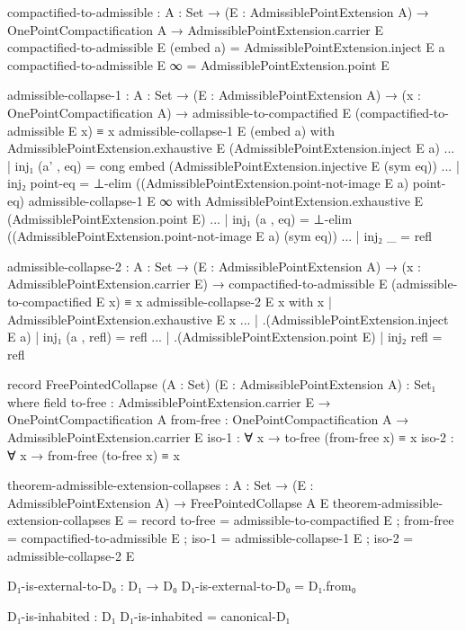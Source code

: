 \documentclass[11pt,a4paper]{book}
\begin{document}
\begin{code}
compactified-to-admissible : {A : Set} → (E : AdmissiblePointExtension A)
                          → OnePointCompactification A
                          → AdmissiblePointExtension.carrier E
compactified-to-admissible E (embed a) = AdmissiblePointExtension.inject E a
compactified-to-admissible E ∞         = AdmissiblePointExtension.point E

admissible-collapse-1 : {A : Set} → (E : AdmissiblePointExtension A)
                     → (x : OnePointCompactification A)
                     → admissible-to-compactified E (compactified-to-admissible E x) ≡ x
admissible-collapse-1 E (embed a) with AdmissiblePointExtension.exhaustive E (AdmissiblePointExtension.inject E a)
... | inj₁ (a' , eq) = cong embed (AdmissiblePointExtension.injective E (sym eq))
... | inj₂ point-eq  = ⊥-elim ((AdmissiblePointExtension.point-not-image E a) point-eq)
admissible-collapse-1 E ∞ with AdmissiblePointExtension.exhaustive E (AdmissiblePointExtension.point E)
... | inj₁ (a , eq) = ⊥-elim ((AdmissiblePointExtension.point-not-image E a) (sym eq))
... | inj₂ _        = refl

admissible-collapse-2 : {A : Set} → (E : AdmissiblePointExtension A)
                     → (x : AdmissiblePointExtension.carrier E)
                     → compactified-to-admissible E (admissible-to-compactified E x) ≡ x
admissible-collapse-2 E x with x | AdmissiblePointExtension.exhaustive E x
... | .(AdmissiblePointExtension.inject E a) | inj₁ (a , refl) = refl
... | .(AdmissiblePointExtension.point E)    | inj₂ refl        = refl

record FreePointedCollapse (A : Set) (E : AdmissiblePointExtension A) : Set₁ where
  field
    to-free   : AdmissiblePointExtension.carrier E → OnePointCompactification A
    from-free : OnePointCompactification A → AdmissiblePointExtension.carrier E
    iso-1     : ∀ x → to-free (from-free x) ≡ x
    iso-2     : ∀ x → from-free (to-free x) ≡ x

theorem-admissible-extension-collapses : {A : Set} → (E : AdmissiblePointExtension A) → FreePointedCollapse A E
theorem-admissible-extension-collapses E = record
  { to-free = admissible-to-compactified E
  ; from-free = compactified-to-admissible E
  ; iso-1 = admissible-collapse-1 E
  ; iso-2 = admissible-collapse-2 E
  }

D₁-is-external-to-D₀ : D₁ → D₀
D₁-is-external-to-D₀ = D₁.from₀

D₁-is-inhabited : D₁
D₁-is-inhabited = canonical-D₁
\end{code}
\end{document}
